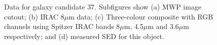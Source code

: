 \documentclass[times,usenatbib]{mn2e}
\begin{document}
\begin{figure}
\begin{center}
\caption{Data for galaxy candidate 37. Subfigures show (a) MWP image cutout; (b) IRAC 8$\mu$m data; (c) Three-colour composite with RGB channels using Spitzer IRAC bands 8$\mu$m, 4.5$\mu$m and 3.6$\mu$m respectively; and (d) measured SED for this object.}
\label{gal37}
\end{center}
\end{figure} 
\end{document}

